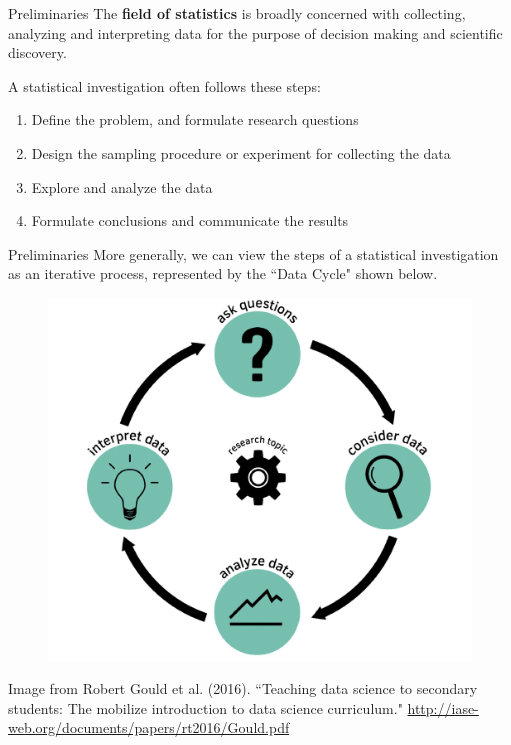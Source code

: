 \documentclass[10pt]{beamer}
\begin{document}
\begin{frame}{Preliminaries}
The \textbf{field of statistics} is broadly concerned with collecting, analyzing and interpreting data for the purpose of decision making and scientific discovery.
\vspace{15pt}

A statistical investigation often follows these steps:
\begin{enumerate}
\item Define the problem, and formulate research questions
\item Design the sampling procedure or experiment for collecting the data
\item Explore and analyze the data  
\item Formulate conclusions and communicate the results\\
\end{enumerate}
\end{frame}

\begin{frame}{Preliminaries}
More generally, we can view the steps of a statistical investigation as an iterative process, represented by the ``Data Cycle" shown below.
\begin{figure}
\includegraphics[scale=0.25]{figure/data_cycle.png}
\end{figure}
\scriptsize Image from Robert Gould et al. (2016). ``Teaching data science to secondary students: The mobilize introduction to data science curriculum." \url{http://iase-web.org/documents/papers/rt2016/Gould.pdf}
\end{frame}
\end{document}
